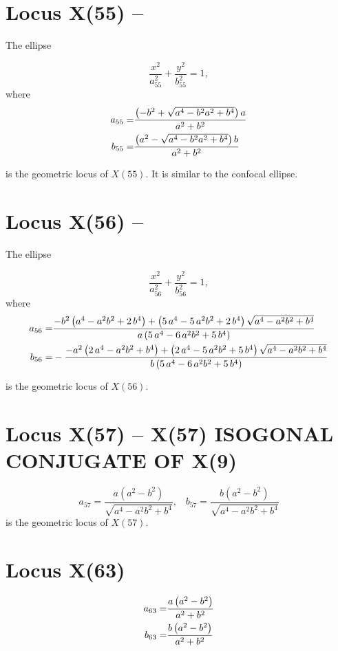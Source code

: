 \documentclass[11pt]{amsart}
\theoremstyle{plain}
\theoremstyle{definition}
\begin{document}
      
      \section{Locus X(55) --  }
      
      
      The ellipse 
      
      \[ \frac{x^2}{a_{55}^2}+\frac{y^2}{b_{55}^2}=1, \]
      where
      \[   \aligned
      a_{55}=&  {\frac { \left( -{b}^{2}+\sqrt {{a}^{4}-{b}^{2}{a}^{2}+{b}^{4}}
      		\right) a}{{a}^{2}+{b}^{2}}}
       \\
       b_{55} =&  {\frac { \left( {a}^{2}-\sqrt {{a}^{4}-{b}^{2}{a}^{2}+{b}^{4}}
       	\right) b}{{a}^{2}+{b}^{2}}}
      \endaligned
      \]
      
      is the geometric locus of $X(55)$.  It is similar to the confocal ellipse. 
      
      
      \section{Locus X(56) --  }
      
      
      The ellipse 
      
      \[ \frac{x^2}{a_{56}^2}+\frac{y^2}{b_{56}^2}=1, \]
      where
      \[   \aligned
      a_{ 56}=&  {\frac {-{b}^{2} \left( {a}^{4}-{a}^{2}{b}^{2}+2\,{b}^{4} \right) +
      		\left( 5\,{a}^{4}-5\,{a}^{2}{b}^{2}+2\,{b}^{4} \right) \sqrt {{a}^{4}
      			-{a}^{2}{b}^{2}+{b}^{4}}}{a \left( 5\,{a}^{4}-6\,{a}^{2}{b}^{2}+5\,{b}
      		^{4} \right) }}
      \\
      b_{56}=&  -{\frac {-{a}^{2} \left( 2\,{a}^{4}-{a}^{2}{b}^{2}+{b}^{4} \right) +
      		\left( 2\,{a}^{4}-5\,{a}^{2}{b}^{2}+5\,{b}^{4} \right) \sqrt {{a}^{4}
      			-{a}^{2}{b}^{2}+{b}^{4}}}{b \left( 5\,{a}^{4}-6\,{a}^{2}{b}^{2}+5\,{b}
      		^{4} \right) }}
      \endaligned
      \]
      
      is the geometric locus of $X(56)$.
      
      \section{Locus X(57) -- 
      	X(57)  ISOGONAL CONJUGATE OF X(9)}
   \[   
     a_{57}=\frac{a (a^2- b^2)}{ \sqrt{ a^4-a^2 b^2+b^4}},\;\;\;
       b_{57}=\frac{b (a^2- b^2)}{ \sqrt{ a^4-a^2 b^2+b^4}}
     \]
     is the geometric locus of $X(57)$.
          
     \section{Locus X(63) }
     \[   \aligned
     a_{ 63}=& {\frac {a \left( {a}^{2}-{b}^{2} \right) }{{a}^{2}+{b}^{2}}}\\
     b_{63}=& {\frac {b \left( {a}^{2}-{b}^{2} \right) }{{a}^{2}+{b}^{2}}}
     \endaligned
     \]
     
\end{document}
